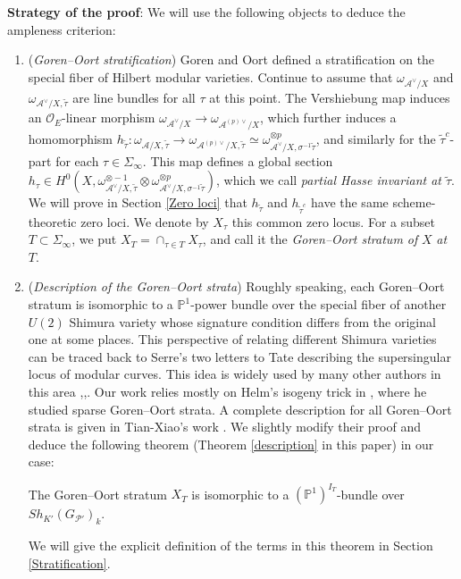 \documentclass{article}
\begin{document}
\medskip
\noindent\textbf{Strategy of the proof}: We will use the following objects to deduce the ampleness criterion:
\begin{enumerate}
	\item (\emph{Goren--Oort stratification}) Goren and Oort \citep{Goren--Oort} defined a stratification on the special fiber of Hilbert modular varieties. Continue to assume that $\omega_{\mathcal{A}^\vee/X}$ and $\omega_{\mathcal{A}^\vee/X,\tilde\tau}$ are line bundles for all $\tau$ at this point. The Vershiebung map induces an $\mathcal{O}_E$-linear morphism $\omega_{\mathcal{A}^\vee/X}\longrightarrow\omega_{\mathcal{A}^{(p)\vee}/X}$, which further induces a homomorphism $h_{\tilde\tau}:\omega_{\mathcal{A}/X,\tilde\tau}\longrightarrow\omega_{\mathcal{A}^{(p)\vee}/X,\tilde\tau}\simeq \omega^{\otimes p}_{\mathcal{A}^\vee/X,\sigma^{-1}\tilde\tau}$, and similarly for the $\tilde\tau^c$-part for each $\tau\in\Sigma_{\infty}$. This map defines a global section $h_\tau\in H^0(X,\omega_{\mathcal{A}^\vee/X,\tilde\tau}^{\otimes -1}\otimes \omega_{\mathcal{A}^\vee/X,\sigma^{-1}\tilde\tau}^{\otimes p})$, which we call \emph{partial Hasse invariant at $\tilde\tau$}. We will prove in Section \ref{Zero loci} that $h_{\tilde\tau}$ and $h_{\tilde\tau^c}$ have the same scheme-theoretic zero loci. We denote by $X_\tau$ this common zero locus. For a subset $T\subset \Sigma_{\infty}$, we put $X_T=\cap_{\tau\in T}X_\tau$, and call it the \emph{Goren--Oort stratum of} $X$ \emph{at} $T$.
	
	\item (\emph{Description of the Goren--Oort strata}) Roughly speaking, each Goren--Oort stratum is isomorphic to a $\mathbb{P}^1$-power bundle over the special fiber of another $U(2)$ Shimura variety whose signature condition differs from the original one at some places. This perspective of relating different Shimura varieties can be traced back to Serre's two letters to Tate \citep{Serre-to-Tate} describing the supersingular locus of modular curves. This idea is widely used by many other authors in this area \citep{Diamond-Kassaei-Sasaki},\citep{Helm-Tian-Xiao},\citep{Tian-Xiao}. Our work relies mostly on Helm's isogeny trick in \citep{Helm}, where he studied sparse Goren--Oort strata. A complete description for all Goren--Oort strata is given in Tian-Xiao's work \citep{Tian-Xiao}. We slightly modify their proof and deduce the following theorem \textnormal{(Theorem \ref{description} in this paper)} in our case:
	\begin{theorem}
		The Goren--Oort stratum $X_T$ is isomorphic to a $(\mathbb{P}^1)^{I_T}$-bundle over $Sh_{K'}(G_{\mathcal{P}'})_k$. 
	\end{theorem}
	We will give the explicit definition of the terms in this theorem in Section \ref{Stratification}.
	

\end{enumerate}
\end{document}
